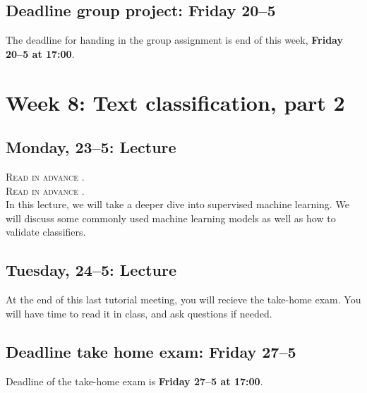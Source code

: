 \subsection*{Deadline group project: Friday 20--5}
The deadline for handing in the group assignment is end of this week, \textbf{Friday 20--5 at 17:00}.

\section*{Week 8: Text classification, part 2}

\subsection*{Monday, 23--5: Lecture}
\textsc{ Read in advance \cite{jordan_mitchell}.} \\
\textsc{ Read in advance \cite{meppelink_reliable_2021}.}\\

In this lecture, we will take a deeper dive into supervised machine learning. We will discuss some commonly used machine learning models as well as how to validate classifiers.

\subsection*{Tuesday, 24--5: Lecture}
At the end of this last tutorial meeting, you will recieve the take-home exam. You will have time to read it in class, and ask questions if needed. \\

\subsection*{Deadline take home exam: Friday 27--5}
Deadline of the take-home exam is \textbf{Friday 27--5 at 17:00}.







